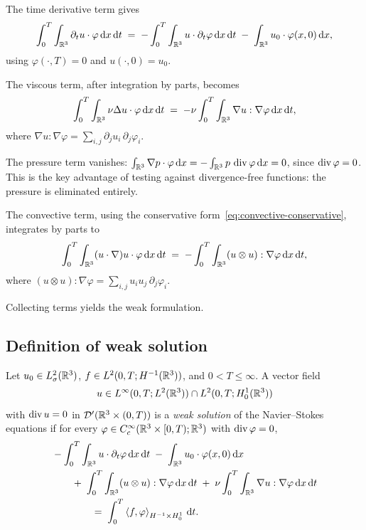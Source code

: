 The time derivative term gives
\[
  \int_{0}^{T} \int_{\mathbb{R}^{3}} \partial_{t} u \cdot \varphi \,\mathrm{d} x \,\mathrm{d} t
  \;=\;
  -\int_{0}^{T} \int_{\mathbb{R}^{3}} u \cdot \partial_{t} \varphi \,\mathrm{d} x \,\mathrm{d} t
  \;-\;
  \int_{\mathbb{R}^{3}} u_{0} \cdot \varphi(x, 0) \,\mathrm{d} x,
\]
using $\varphi(\cdot, T) = 0$ and $u(\cdot, 0) = u_{0}$.

The viscous term, after integration by parts, becomes
\[
  \int_{0}^{T} \int_{\mathbb{R}^{3}} \nu \Delta u \cdot \varphi \,\mathrm{d} x \,\mathrm{d} t
  \;=\;
  -\nu \int_{0}^{T} \int_{\mathbb{R}^{3}} \nabla u : \nabla \varphi \,\mathrm{d} x \,\mathrm{d} t,
\]
where $\nabla u : \nabla \varphi = \sum_{i,j} \partial_{j} u_{i}\,\partial_{j} \varphi_{i}$.

The pressure term vanishes:
$\int_{\mathbb{R}^{3}} \nabla p \cdot \varphi \,\mathrm{d} x = -\int_{\mathbb{R}^{3}} p\,\operatorname{div} \varphi
\,\mathrm{d} x = 0$,
since $\operatorname{div} \varphi = 0$.  This is the key advantage of testing against
divergence-free functions: the pressure is eliminated entirely.

The convective term, using the conservative form~\eqref{eq:convective-conservative},
integrates by parts to
\[
  \int_{0}^{T} \int_{\mathbb{R}^{3}} (u \cdot \nabla) u \cdot \varphi \,\mathrm{d} x \,\mathrm{d} t
  \;=\;
  -\int_{0}^{T} \int_{\mathbb{R}^{3}} (u \otimes u) : \nabla \varphi \,\mathrm{d} x \,\mathrm{d} t,
\]
where $(u \otimes u) : \nabla \varphi = \sum_{i,j} u_{i} u_{j}\,\partial_{j} \varphi_{i}$.

Collecting terms yields the weak formulation.

\subsection{Definition of weak solution}

\begin{definition}%
  \label{def:weak-ns}
  Let $u_{0} \in L^{2}_\sigma(\mathbb{R}^{3})$, $f \in L^{2}(0, T; H^{-1}(\mathbb{R}^{3}))$, and
  $0 < T \le \infty$.  A vector field
  \[
    u \in L^{\infty}(0, T; L^{2}(\mathbb{R}^{3}))
    \cap L^{2}(0, T; H^{1}_0(\mathbb{R}^{3}))
  \]
  with $\operatorname{div} u = 0$ in $\mathcal{D}'(\mathbb{R}^{3} \times (0, T))$ is a \emph{weak
  solution} of the Navier--Stokes equations if for every
  $\varphi \in C^\infty_c(\mathbb{R}^{3} \times [0, T); \mathbb{R}^{3})$ with $\operatorname{div} \varphi = 0$,
  \begin{equation}\label{eq:ns-weak}
    \begin{aligned}
      &-\int_{0}^{T} \int_{\mathbb{R}^{3}} u \cdot \partial_{t} \varphi \,\mathrm{d} x \,\mathrm{d} t
      \;-\;
      \int_{\mathbb{R}^{3}} u_{0} \cdot \varphi(x, 0) \,\mathrm{d} x \\
      &\qquad
      +\;\int_{0}^{T} \int_{\mathbb{R}^{3}} (u \otimes u) : \nabla \varphi \,\mathrm{d} x \,\mathrm{d} t
      \;+\;
      \nu \int_{0}^{T} \int_{\mathbb{R}^{3}} \nabla u : \nabla \varphi \,\mathrm{d} x \,\mathrm{d} t \\
      &\qquad\qquad
      =\;
      \int_{0}^{T} \left\langle f, \varphi \right\rangle_{H^{-1} \times H^{1}_0} \,\mathrm{d} t.
    \end{aligned}
  \end{equation}
\end{definition}

